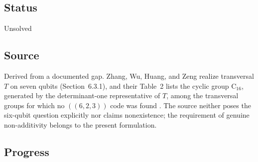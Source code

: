 \subsection*{Status}

Unsolved

\subsection*{Source}

Derived from a documented gap.  Zhang, Wu, Huang, and Zeng realize
transversal $T$ on seven qubits (Section~6.3.1), and their Table~2 lists the
cyclic group $\mathrm C_{16}$, generated by the determinant-one representative
of $T$, among the transversal groups for which no $((6,2,3))$ code was found
.  The source neither poses the six-qubit
question explicitly nor claims nonexistence; the requirement of genuine
non-additivity belongs to the present formulation.

\subsection*{Progress}

